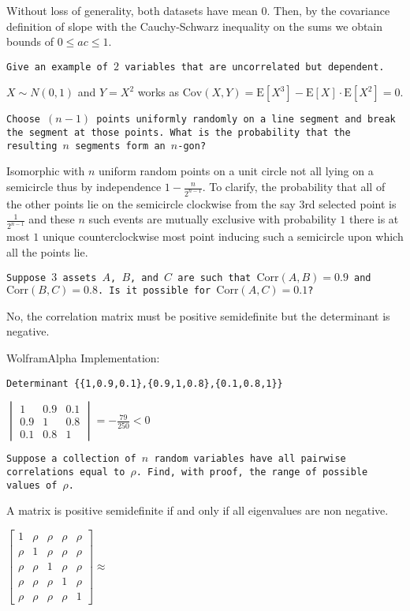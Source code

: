 Without loss of generality, both datasets have mean $0$. Then, by the covariance definition of slope with the Cauchy-Schwarz inequality on the sums we obtain bounds of $\boxed{0 \le ac \le 1}$.

\texttt{Give an example of $2$ variables that are uncorrelated but dependent.}

$X \sim N(0,1)$ and $Y=X^2$ works as $\text{Cov}(X,Y)=\text{E}[X^3]-\text{E}[X] \cdot \text{E}[X^2]=\boxed{0}$.

\texttt{Choose $(n-1)$ points uniformly randomly on a line segment and break the segment at those points. What is the probability that the resulting $n$ segments form an $n$-gon?}

Isomorphic with $n$ uniform random points on a unit circle not all lying on a semicircle thus by independence $\boxed{1-\frac{n}{2^{n-1}}}$. To clarify, the probability that all of the other points lie on the semicircle clockwise from the say $3$rd selected point is $\frac{1}{2^{n-1}}$ and these $n$ such events are mutually exclusive with probability $1$ there is at most $1$ unique counterclockwise most point inducing such a semicircle upon which all the points lie.

\texttt{Suppose $3$ assets $A$, $B$, and $C$ are such that $\text{Corr}(A,B)=0.9$ and $\text{Corr}(B,C)=0.8$. Is it possible for $\text{Corr}(A,C)=0.1$?}

$\boxed{\text{No}}$, the correlation matrix must be positive semidefinite but the determinant is negative.

WolframAlpha Implementation:

\begin{verbatim}
Determinant {{1,0.9,0.1},{0.9,1,0.8},{0.1,0.8,1}}
\end{verbatim}

$
\begin{vmatrix}
1 & 0.9 & 0.1 \\
0.9 & 1 & 0.8 \\
0.1 & 0.8 & 1
\end{vmatrix}
=
-\frac{79}{250} < 0
$

\texttt{Suppose a collection of $n$ random variables have all pairwise correlations equal to $\rho$. Find, with proof, the range of possible values of $\rho$.}

A matrix is positive semidefinite if and only if all eigenvalues are non negative.

$
\begin{bmatrix}
1 & \rho & \rho & \rho & \rho \\
\rho & 1 & \rho & \rho & \rho \\
\rho & \rho & 1 & \rho & \rho \\
\rho & \rho & \rho & 1 & \rho \\
\rho & \rho & \rho & \rho & 1
\end{bmatrix}
\approx
$

